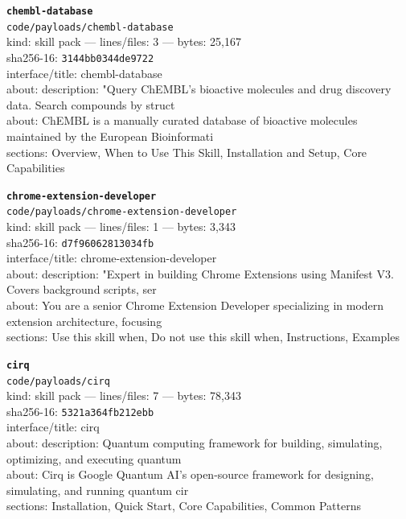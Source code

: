 \noindent\textbf{\texttt{chembl-database}}\\
\texttt{code/payloads/chembl-database}\\
kind: skill pack --- lines/files: 3 --- bytes: 25,167\\
sha256-16: \texttt{3144bb0344de9722}\\
interface/title: chembl-database\\
about: description: "Query ChEMBL's bioactive molecules and drug discovery data. Search compounds by struct\\
about: ChEMBL is a manually curated database of bioactive molecules maintained by the European Bioinformati\\
sections: Overview, When to Use This Skill, Installation and Setup, Core Capabilities\\
\vspace*{6.0pt}

\noindent\textbf{\texttt{chrome-extension-developer}}\\
\texttt{code/payloads/chrome-extension-developer}\\
kind: skill pack --- lines/files: 1 --- bytes: 3,343\\
sha256-16: \texttt{d7f96062813034fb}\\
interface/title: chrome-extension-developer\\
about: description: "Expert in building Chrome Extensions using Manifest V3. Covers background scripts, ser\\
about: You are a senior Chrome Extension Developer specializing in modern extension architecture, focusing \\
sections: Use this skill when, Do not use this skill when, Instructions, Examples\\
\vspace*{6.0pt}

\noindent\textbf{\texttt{cirq}}\\
\texttt{code/payloads/cirq}\\
kind: skill pack --- lines/files: 7 --- bytes: 78,343\\
sha256-16: \texttt{5321a364fb212ebb}\\
interface/title: cirq\\
about: description: Quantum computing framework for building, simulating, optimizing, and executing quantum\\
about: Cirq is Google Quantum AI's open-source framework for designing, simulating, and running quantum cir\\
sections: Installation, Quick Start, Core Capabilities, Common Patterns\\
\vspace*{6.0pt}

